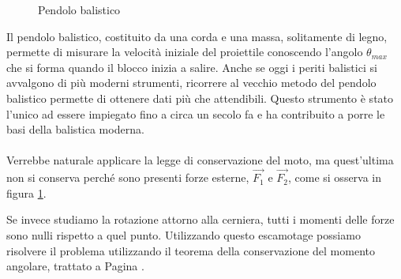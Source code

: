 \begin{figure}[H]
\begin{minipage}[c]{0.3\textwidth}
    \end{minipage}
    \caption{Pendolo balistico}
    \label{fig:pendoloBalistico}
\end{figure}

Il pendolo balistico, costituito da una corda e una massa, solitamente di legno,  permette di misurare la velocità iniziale del proiettile conoscendo l'angolo $\theta_{max}$ che si forma quando il blocco inizia a salire. Anche se oggi i periti balistici si avvalgono di più moderni strumenti, ricorrere al vecchio metodo del pendolo balistico permette di ottenere dati più che
attendibili. Questo strumento è stato l’unico ad essere impiegato fino a circa un secolo fa e ha contribuito a porre le basi della balistica moderna. 

\paragraph{}
Verrebbe naturale applicare la legge di conservazione del moto, ma quest'ultima non si conserva perché sono presenti forze esterne, $\vec{F_1}$ e $\vec{F_2}$, come si osserva in figura \ref{fig:pendoloBalistico}.

Se invece studiamo la rotazione attorno alla cerniera, tutti i momenti delle forze sono nulli rispetto a quel punto.
Utilizzando questo escamotage possiamo risolvere il problema utilizzando il teorema della conservazione del momento angolare, trattato a Pagina \pageref{ConservazioneMomentoAng}.

